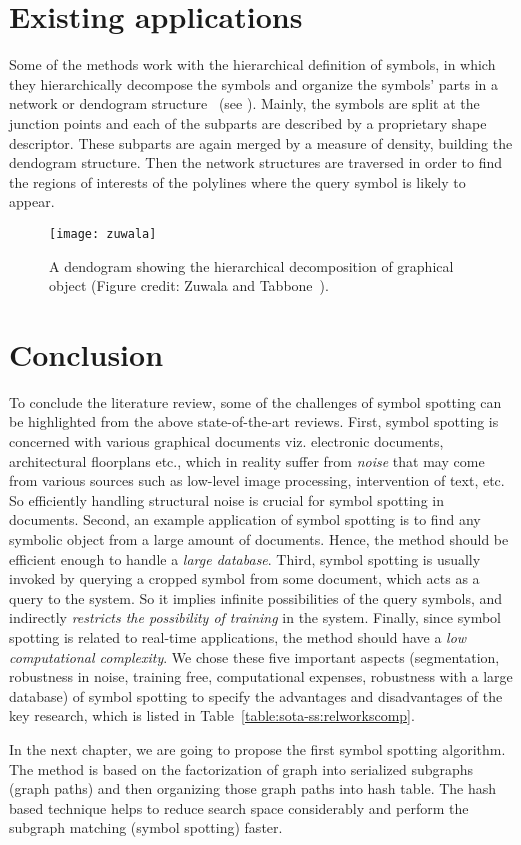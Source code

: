 \section{Existing applications}
\label{sec:sota-ss:hier-symb-repr}
Some of the methods work with the hierarchical definition of symbols, in which they hierarchically decompose the symbols and organize the symbols' parts in a network or dendogram structure~\cite{Zuwala2006} (see ). Mainly, the symbols are split at the junction points and each of the subparts are described by a proprietary shape descriptor. These subparts are again merged by a measure of density, building the dendogram structure. Then the network structures are traversed in order to find the regions of interests of the polylines where the query symbol is likely to appear.
\begin{figure}
\begin{center}
\texttt{[image: zuwala]}
\end{center}
\caption{A dendogram showing the hierarchical decomposition of graphical object (Figure credit: Zuwala and Tabbone~\cite{Zuwala2006}).}
\label{fig:sota-ss:zuwala}
\end{figure}

\section{Conclusion}
\label{sec:sota-ss:concl}
To conclude the literature review, some of the challenges of symbol spotting can be highlighted from the above state-of-the-art reviews. First, symbol spotting is concerned with various graphical documents viz. electronic documents, architectural floorplans etc., which in reality suffer from \emph{noise} that may come from various sources such as low-level image processing, intervention of text, etc. So efficiently handling structural noise is crucial for symbol spotting in documents. Second, an example application of symbol spotting is to find any symbolic object from a large amount of documents. Hence, the method should be efficient enough to handle a \emph{large database}. Third, symbol spotting is usually invoked by querying a cropped symbol from some document, which acts as a query to the system. So it implies infinite possibilities of the query symbols, and indirectly \emph{restricts the possibility of training} in the system. Finally, since symbol spotting is related to real-time applications, the method should have a \emph{low computational complexity}. We chose these five important aspects (segmentation, robustness in noise, training free, computational expenses, robustness with a large database) of symbol spotting to specify the advantages and disadvantages of the key research, which is listed in Table~\ref{table:sota-ss:relworkscomp}.

In the next chapter, we are going to propose the first symbol spotting algorithm. The method is based on the factorization of graph into serialized subgraphs (graph paths) and then organizing those graph paths into hash table. The hash based technique helps to reduce search space considerably and perform the subgraph matching (symbol spotting) faster.